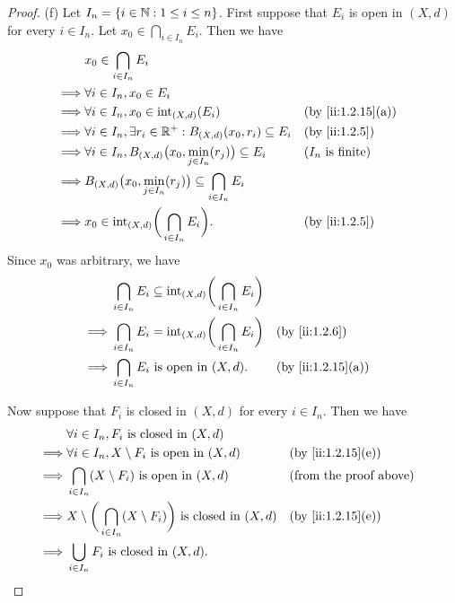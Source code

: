 \begin{proof}{(f)}
  Let \(I_n = \left\lbrace i \in \mathbb{N} : 1 \leq i \leq n\right\rbrace\).
  First suppose that \(E_i\) is open in \((X, d)\) for every \(i \in I_n\).
  Let \(x_0 \in \bigcap_{i \in I_n} E_i\).
  Then we have
  \begin{align*}
             & x_0 \in \bigcap_{i \in I_n} E_i                                                                                  \\
    \implies & \forall i \in I_n, x_0 \in E_i                                                                                   \\
    \implies & \forall i \in I_n, x_0 \in \text{int}_{(X, d)}(E_i)                              &  & \by{ii:1.2.15}[a]          \\
    \implies & \forall i \in I_n, \exists r_i \in \R^+ : B_{(X, d)}(x_0, r_i) \subseteq E_i     &  & \by{ii:1.2.5}              \\
    \implies & \forall i \in I_n, B_{(X, d)}\big(x_0, \min_{j \in I_n}(r_j)\big) \subseteq E_i  &  & \text{(\(I_n\) is finite)} \\
    \implies & B_{(X, d)}\big(x_0, \min_{j \in I_n}(r_j)\big) \subseteq \bigcap_{i \in I_n} E_i                                 \\
    \implies & x_0 \in \text{int}_{(X, d)}\bigg(\bigcap_{i \in I_n} E_i\bigg).                  &  & \by{ii:1.2.5}
  \end{align*}
  Since \(x_0\) was arbitrary, we have
  \begin{align*}
             & \bigcap_{i \in I_n} E_i \subseteq \text{int}_{(X, d)}\bigg(\bigcap_{i \in I_n} E_i\bigg)                        \\
    \implies & \bigcap_{i \in I_n} E_i = \text{int}_{(X, d)}\bigg(\bigcap_{i \in I_n} E_i\bigg)         &  & \by{ii:1.2.6}     \\
    \implies & \bigcap_{i \in I_n} E_i \text{ is open in } (X, d).                                      &  & \by{ii:1.2.15}[a]
  \end{align*}

  Now suppose that \(F_i\) is closed in \((X, d)\) for every \(i \in I_n\).
  Then we have
  \begin{align*}
             & \forall i \in I_n, F_i \text{ is closed in } (X, d)                                                                           \\
    \implies & \forall i \in I_n, X \setminus F_i \text{ is open in } (X, d)                              &  & \by{ii:1.2.15}[e]             \\
    \implies & \bigcap_{i \in I_n} (X \setminus F_i) \text{ is open in } (X, d)                           &  & \text{(from the proof above)} \\
    \implies & X \setminus \bigg(\bigcap_{i \in I_n} (X \setminus F_i)\bigg) \text{ is closed in } (X, d) &  & \by{ii:1.2.15}[e]             \\
    \implies & \bigcup_{i \in I_n} F_i \text{ is closed in } (X, d).
  \end{align*}
\end{proof}

